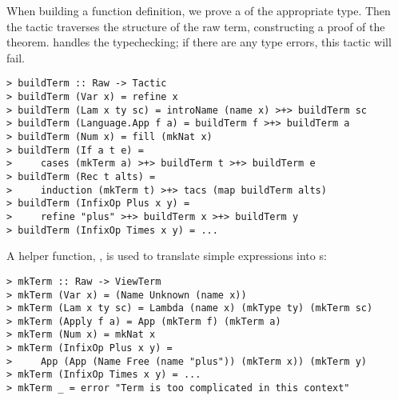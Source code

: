 \label{funlapp}

When building a function definition, we prove a  of the
appropriate type. Then the  tactic traverses the
structure of the raw term, constructing a proof of the
theorem. \Ivor{} handles the typechecking; if there are any type
errors, this tactic will fail.

\begin{verbatim}
> buildTerm :: Raw -> Tactic
> buildTerm (Var x) = refine x
> buildTerm (Lam x ty sc) = introName (name x) >+> buildTerm sc
> buildTerm (Language.App f a) = buildTerm f >+> buildTerm a
> buildTerm (Num x) = fill (mkNat x)
> buildTerm (If a t e) = 
>     cases (mkTerm a) >+> buildTerm t >+> buildTerm e
> buildTerm (Rec t alts) =
>     induction (mkTerm t) >+> tacs (map buildTerm alts)
> buildTerm (InfixOp Plus x y) = 
>     refine "plus" >+> buildTerm x >+> buildTerm y
> buildTerm (InfixOp Times x y) = ...
\end{verbatim}

A helper function, , is used to translate simple
expressions into s:

\begin{verbatim}
> mkTerm :: Raw -> ViewTerm
> mkTerm (Var x) = (Name Unknown (name x))
> mkTerm (Lam x ty sc) = Lambda (name x) (mkType ty) (mkTerm sc)
> mkTerm (Apply f a) = App (mkTerm f) (mkTerm a)
> mkTerm (Num x) = mkNat x
> mkTerm (InfixOp Plus x y) = 
>     App (App (Name Free (name "plus")) (mkTerm x)) (mkTerm y)
> mkTerm (InfixOp Times x y) = ...
> mkTerm _ = error "Term is too complicated in this context"
\end{verbatim}